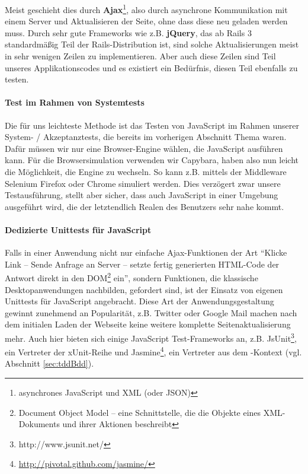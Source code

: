 Meist geschieht dies durch \textbf{Ajax}\footnote{asynchrones JavaScript und XML (oder JSON)}, also durch asynchrone Kommunikation mit einem Server und Aktualisieren der Seite, ohne dass diese neu geladen werden muss. Durch sehr gute Frameworks wie z.B. \textbf{jQuery}, das ab Rails 3 standardmäßig Teil der Rails-Distribution ist, sind solche Aktualisierungen meist in sehr wenigen Zeilen zu implementieren. Aber auch diese Zeilen sind Teil unseres Applikationscodes und es existiert ein Bedürfnis, diesen Teil ebenfalls zu testen.


\paragraph{Test im Rahmen von Systemtests} Die für uns leichteste Methode ist das Testen von JavaScript im Rahmen unserer System- / Akzeptanztests, die bereits im vorherigen Abschnitt Thema waren. Dafür müssen wir nur eine Browser-Engine wählen, die JavaScript ausführen kann. Für die Browsersimulation verwenden wir Capybara, haben also nun leicht die Möglichkeit, die Engine zu wechseln. So kann z.B. mittels der Middleware Selenium Firefox oder Chrome simuliert werden. Dies verzögert zwar unsere Testausführung, stellt aber sicher, dass auch JavaScript in einer Umgebung ausgeführt wird, die der letztendlich Realen des Benutzers sehr nahe kommt.
\paragraph{Dedizierte Unittests für JavaScript} Falls in einer Anwendung nicht nur einfache Ajax-Funktionen der Art "`Klicke Link -- Sende Anfrage an Server -- setzte fertig generierten HTML-Code der Antwort direkt in den DOM\footnote{Document Object Model -- eine Schnittstelle, die die Objekte eines XML-Dokuments und ihrer Aktionen beschreibt} ein"', sondern Funktionen, die klassische Desktopanwendungen nachbilden, gefordert sind, ist der Einsatz von eigenen Unittests für JavaScript angebracht.
Diese Art der Anwendungsgestaltung gewinnt zunehmend an Popularität, z.B. Twitter oder Google Mail machen nach dem initialen Laden der Webseite keine weitere komplette Seitenaktualisierung mehr.
Auch hier bieten sich einige JavaScript Test-Frameworks an, z.B. JsUnit\footnote{http://www.jsunit.net/}, ein Vertreter der xUnit-Reihe und Jasmine\footnote{\url{http://pivotal.github.com/jasmine/}}, ein Vertreter aus dem -Kontext (vgl. Abschnitt \ref{sec:tddBdd}).

